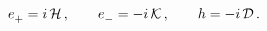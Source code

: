 \begin{equation}\label{boro1.8}
e_{+}^{}=i\,{\cal H}\,,\qquad e_{-}^{}=-i\,{\cal K}\,,\qquad h= - i\,{\cal D}\,.
\end{equation}

